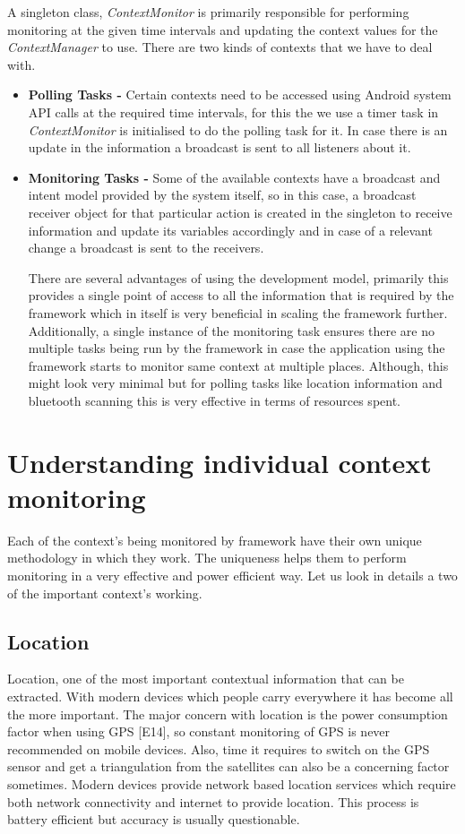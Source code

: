 \documentclass[12pt]{report}
\begin{document}
A singleton class, \textit{ContextMonitor} is primarily responsible for performing monitoring at the given time intervals and updating the context values for the \textit{ContextManager} to use. There are two kinds of contexts that we have to deal with.

\begin{itemize}
\item \textbf{Polling Tasks - } Certain contexts need to be accessed using Android system API calls at the required time intervals, for this the we use a timer task in \textit{ContextMonitor} is initialised to do the polling task for it. In case there is an update in the information a broadcast is sent to all listeners about it.

\item \textbf{Monitoring Tasks - } Some of the available contexts have a broadcast and intent model provided by the system itself, so in this case, a broadcast receiver object for that particular action is created in the singleton to receive information and update its variables accordingly and in case of a relevant change a broadcast is sent to the receivers.

There are several advantages of using the development model, primarily this provides a single point of access to all the information that is required by the framework which in itself is very beneficial in scaling the framework further. Additionally, a single instance of the monitoring task ensures there are no multiple tasks being run by the framework in case the application using the framework starts to monitor same context at multiple places. Although, this might look very minimal but for polling tasks like location information and bluetooth scanning this is very effective in terms of resources spent.

\end{itemize}


\section{Understanding individual context monitoring}
Each of the context's being monitored by framework have their own unique methodology in which they work. The uniqueness helps them to perform monitoring in a very effective and power efficient way. Let us look in details a two of the important context's working.

\subsection{Location}
Location, one of the most important contextual information that can be extracted. With modern devices which people carry everywhere it has become all the more important. The major concern with location is the power consumption factor when using GPS [E14], so constant monitoring of GPS is never recommended on mobile devices. Also, time it requires to switch on the GPS sensor and get a triangulation from the satellites can also be a concerning factor sometimes. Modern devices provide network based location services which require both network connectivity and internet to provide location. This process is battery efficient but accuracy is usually questionable. 
\end{document}
